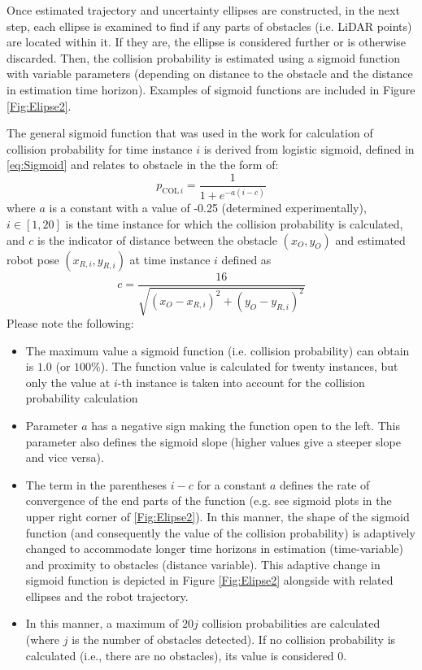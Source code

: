 Once estimated trajectory and uncertainty ellipses are constructed, in the next step, each ellipse is examined to find if any parts of obstacles (i.e. LiDAR points) are located within it. If they are, the ellipse is considered further or is otherwise discarded. Then, the collision probability is estimated using a sigmoid function with variable parameters (depending on distance to the obstacle and the distance in estimation time horizon). Examples of sigmoid functions are included in Figure \ref{Fig:Elipse2}. 

The general sigmoid function that was used in the work for calculation of collision probability for time instance $i$ is derived from logistic sigmoid, defined in \cref{eq:Sigmoid} and relates to obstacle in the the form of:
\begin{equation}
    p_{\textrm{COL}\,i} = \frac{1}{1+e^{-a(i-c)}}
    \label{eq:CollisionProbability}
\end{equation}
where $a$ is a constant with a value of -0.25 (determined experimentally), $i\in[1,20]$ is the time instance for which the collision probability is calculated, and $c$ is the indicator of distance between the obstacle $(x_O,y_O)$ and estimated robot pose $(x_{R,i},y_{R,i})$ at time instance $i$ defined as
\[
    c=\frac{16}{\sqrt{(x_O-x_{R,i})^2+(y_O-y_{R,i})^2}}
\]
Please note the following:

\begin{itemize}
    \item The maximum value a sigmoid function (i.e. collision probability) can obtain is $1.0$ (or $100\%$). The function value is calculated for twenty instances, but only the value at $i$-th instance is taken into account for the collision probability calculation
    \item Parameter $a$ has a negative sign making the function open to the left. This parameter also defines the sigmoid slope (higher values give a steeper slope and vice versa).
    \item The term in the parentheses $i-c$ for a constant $a$ defines the rate of convergence of the end parts of the function (e.g. see sigmoid plots in the upper right corner of \cref{Fig:Elipse2}). In this manner, the shape of the sigmoid function (and consequently the value of the collision probability) is adaptively changed to accommodate longer time horizons in estimation (time-variable) and proximity to obstacles (distance variable). This adaptive change in sigmoid function is depicted in Figure \ref{Fig:Elipse2} alongside with related ellipses and the robot trajectory.
    \item In this manner, a maximum of $20j$ collision probabilities are calculated (where $j$ is the number of obstacles detected). If no collision probability is calculated (i.e., there are no obstacles), its value is considered 0.
\end{itemize}

